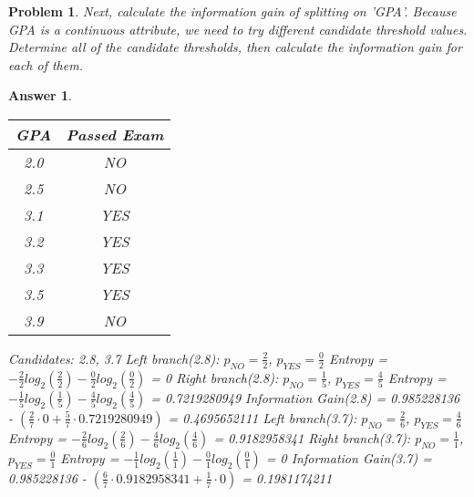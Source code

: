 \documentclass[11pt]{article}
\theoremstyle{description}
\newtheorem{problem}{Problem}
\theoremstyle{break}
\newtheorem*{answer}{Answer}
\begin{document}
    \begin{problem}
        Next, calculate the information gain of splitting on 'GPA'.
        Because GPA is a continuous attribute, we need to try different candidate threshold values.
        Determine all of the candidate thresholds, then calculate the information gain for each
        of them.
    \end{problem}
    \begin{answer}
        \begin{tabular}{c|c}
            GPA & Passed Exam \\
            \hline
            2.0 & NO          \\
            2.5 & NO          \\
            3.1 & YES         \\
            3.2 & YES         \\
            3.3 & YES         \\
            3.5 & YES         \\
            3.9 & NO          \\
        \end{tabular}
        Candidates: 2.8, 3.7\newline
        Left branch(2.8): $p_{NO} = \frac{2}{2}$, $p_{YES} = \frac{0}{2}$\newline
        Entropy = $-\frac{2}{2}log_{2}(\frac{2}{2}) - \frac{0}{2}log_{2}(\frac{0}{2})$\newline
        = 0\newline
        Right branch(2.8): $p_{NO} = \frac{1}{5}$, $p_{YES} = \frac{4}{5}$\newline
        Entropy = $-\frac{1}{5}log_{2}(\frac{1}{5}) - \frac{4}{5}log_{2}(\frac{4}{5})$\newline
        = 0.7219280949\newline
        Information Gain(2.8) = 0.985228136 - $(\frac{2}{7}\cdot 0 + \frac{5}{7}\cdot 0
        .7219280949)$\newline
        = 0.4695652111\newline
        Left branch(3.7): $p_{NO} = \frac{2}{6}$, $p_{YES} = \frac{4}{6}$\newline
        Entropy = $-\frac{2}{6}log_{2}(\frac{2}{6}) - \frac{4}{6}log_{2}(\frac{4}{6})$\newline
        = 0.9182958341\newline
        Right branch(3.7): $p_{NO} = \frac{1}{1}$, $p_{YES} = \frac{0}{1}$\newline
        Entropy = $-\frac{1}{1}log_{2}(\frac{1}{1}) - \frac{0}{1}log_{2}(\frac{0}{1})$\newline
        = 0\newline
        Information Gain(3.7) = 0.985228136 - $(\frac{6}{7}\cdot 0.9182958341 + \frac{1}{7}\cdot
        0)$\newline
        = 0.1981174211\newline
    \end{answer}
\end{document}
